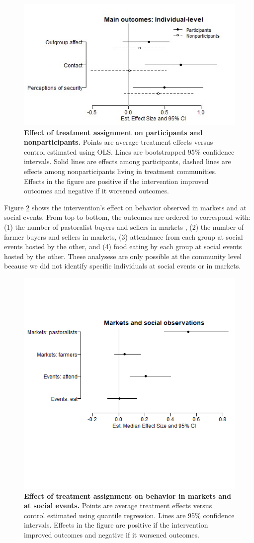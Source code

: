 \documentclass[11pt]{article}
\begin{document}
\begin{figure}[H]
\centering
\includegraphics[width=.7\textwidth]{../../../figs/ecpn_coefplots_MainOuts_panel-cats2.jpg}
\caption{\label{fig:fig2} \textbf{Effect of treatment assignment on participants and nonparticipants.} Points are average treatment effects versus control estimated using OLS. Lines are bootstrapped 95\% confidence intervals.  Solid lines are effects among participants, dashed lines are effects among nonparticipants living in treatment communities.  Effects in the figure are positive if the intervention improved outcomes and negative if it worsened outcomes.}
\end{figure}

Figure \ref{fig:obs} shows the intervention's effect on behavior
observed in markets and at social events. From top to bottom, the
outcomes are ordered to correspond with: (1) the number of pastoralist
buyers and sellers in markets , (2) the number of farmer buyers and
sellers in markets, (3) attendance from each group at social events
hosted by the other, and (4) food eating by each group at social events
hosted by the other. These analysese are only possible at the community
level because we did not identify specific individuals at social events
or in markets.

\begin{figure}[H]
\centering
\includegraphics[width=.7\textwidth]{../../../figs/ecpn_coefplots_markEvents.png}
\vspace{-3cm}
\caption{\label{fig:obs} \textbf{Effect of treatment assignment on behavior in markets and at social events.} Points are average treatment effects versus control estimated using quantile regression. Lines are 95\% confidence intervals.  Effects in the figure are positive if the intervention improved outcomes and negative if it worsened outcomes.}
\end{figure}
\end{document}

